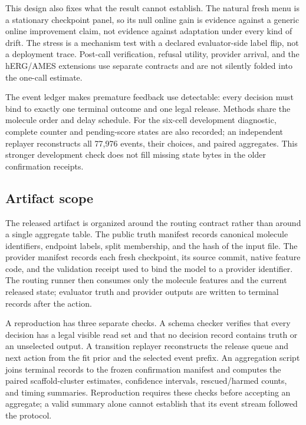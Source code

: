\documentclass[sigconf,anonymous]{aamas}
\begin{document}
This design also fixes what the result cannot establish. The natural fresh menu is a stationary checkpoint panel, so its null online gain is evidence against a generic online improvement claim, not evidence against adaptation under every kind of drift. The stress is a mechanism test with a declared evaluator-side label flip, not a deployment trace. Post-call verification, refusal utility, provider arrival, and the hERG/AMES extensions use separate contracts and are not silently folded into the one-call estimate.

The event ledger makes premature feedback use detectable: every decision must bind to exactly one terminal outcome and one legal release. Methods share the molecule order and delay schedule. For the six-cell development diagnostic, complete counter and pending-score states are also recorded; an independent replayer reconstructs all 77,976 events, their choices, and paired aggregates. This stronger development check does not fill missing state bytes in the older confirmation receipts.



\subsection{Artifact scope}
The released artifact is organized around the routing contract rather than around a single aggregate table. The public truth manifest records canonical molecule identifiers, endpoint labels, split membership, and the hash of the input file. The provider manifest records each fresh checkpoint, its source commit, native feature code, and the validation receipt used to bind the model to a provider identifier. The routing runner then consumes only the molecule features and the current released state; evaluator truth and provider outputs are written to terminal records after the action.



A reproduction has three separate checks. A schema checker verifies that every decision has a legal visible read set and that no decision record contains truth or an unselected output. A transition replayer reconstructs the release queue and next action from the fit prior and the selected event prefix. An aggregation script joins terminal records to the frozen confirmation manifest and computes the paired scaffold-cluster estimates, confidence intervals, rescued/harmed counts, and timing summaries. Reproduction requires these checks before accepting an aggregate; a valid summary alone cannot establish that its event stream followed the protocol.
\end{document}

